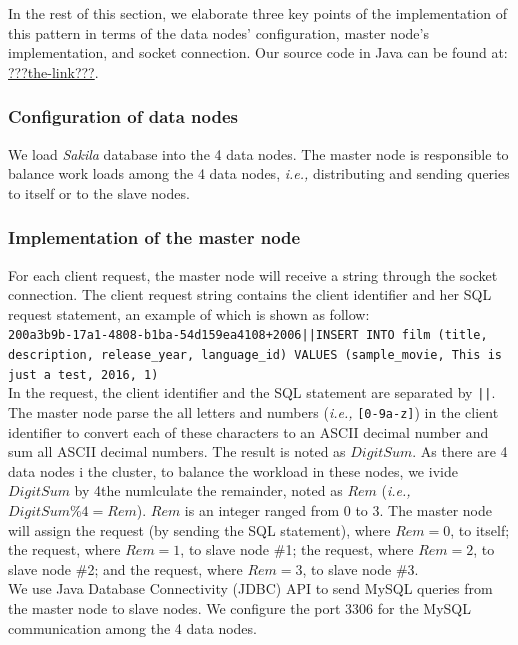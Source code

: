 \documentclass{article}
\begin{document}
In the rest of this section, we elaborate three key points of the implementation of this pattern in terms of the data nodes' configuration, master node's implementation, and socket connection. Our source code in Java can be found at: \url{???the-link???}.

\subsubsection{Configuration of data nodes}
We load \emph{Sakila} database into the 4 data nodes. The master node is responsible to balance work loads among the 4 data nodes, \emph{i.e.,} distributing and sending queries to itself or to the slave nodes.

\subsubsection{Implementation of the master node}\label{master-node}
For each client request, the master node will receive a string through the socket connection. The client request string contains the client identifier and her SQL request statement, an example of which is shown as follow:\\

\texttt{200a3b9b-17a1-4808-b1ba-54d159ea4108+2006||INSERT INTO film (title, description, release\_year, language\_id) VALUES (\textquotesingle sample\_movie\textquotesingle, \textquotesingle This is just a test\textquotesingle, 2016, 1)}\\

In the request, the client identifier and the SQL statement are separated by \texttt{||}. The master node parse the all letters and numbers (\emph{i.e.,} \texttt{[0-9a-z]}) in the client identifier to convert each of these characters to an ASCII decimal number and sum all ASCII decimal numbers. The result is noted as $DigitSum$. As there are 4 data nodes i the cluster, to balance the workload in these nodes, we ivide $DigitSum$ by 4the numlculate the remainder, noted as $Rem$ (\emph{i.e.,} $DigitSum\%4=Rem$). $Rem$ is an integer ranged from 0 to 3. The master node will assign the request (by sending the SQL statement), where $Rem=0$, to itself; the request, where $Rem=1$, to slave node \#1; the request, where $Rem=2$, to slave node \#2; and the request, where $Rem=3$, to slave node \#3.\\

We use Java Database Connectivity (JDBC) API to send MySQL queries from the master node to slave nodes. We configure the port 3306 for the MySQL communication among the 4 data nodes.
\end{document}
